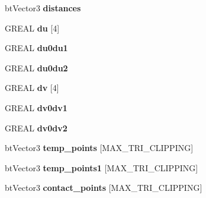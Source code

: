 \begin{DoxyCompactItemize}
bt\+Vector3 {\bfseries distances}
\item 
\mbox{\label{classGIM__TRIANGLE__CALCULATION__CACHE_ae474980d30044017d14e6acd7efdf16b}} 
G\+R\+E\+AL {\bfseries du} \mbox{[}4\mbox{]}
\item 
\mbox{\label{classGIM__TRIANGLE__CALCULATION__CACHE_a1ff1981491d8af6e983b874fc92f4352}} 
G\+R\+E\+AL {\bfseries du0du1}
\item 
\mbox{\label{classGIM__TRIANGLE__CALCULATION__CACHE_a9e8a9a0edf7640943bf33a3b41b1420b}} 
G\+R\+E\+AL {\bfseries du0du2}
\item 
\mbox{\label{classGIM__TRIANGLE__CALCULATION__CACHE_a04a660ca076e471a4c08599baace243a}} 
G\+R\+E\+AL {\bfseries dv} \mbox{[}4\mbox{]}
\item 
\mbox{\label{classGIM__TRIANGLE__CALCULATION__CACHE_a2b501162b45e6c8bc7c5c55d979136e0}} 
G\+R\+E\+AL {\bfseries dv0dv1}
\item 
\mbox{\label{classGIM__TRIANGLE__CALCULATION__CACHE_a27ea3417a38ad40d7f370ef063e6f7f0}} 
G\+R\+E\+AL {\bfseries dv0dv2}
\item 
\mbox{\label{classGIM__TRIANGLE__CALCULATION__CACHE_a076889e78d206b77d790977c9407e390}} 
bt\+Vector3 {\bfseries temp\+\_\+points} \mbox{[}M\+A\+X\+\_\+\+T\+R\+I\+\_\+\+C\+L\+I\+P\+P\+I\+NG\mbox{]}
\item 
\mbox{\label{classGIM__TRIANGLE__CALCULATION__CACHE_ac49bb92226e6125e74cfd5ca6f7e2d02}} 
bt\+Vector3 {\bfseries temp\+\_\+points1} \mbox{[}M\+A\+X\+\_\+\+T\+R\+I\+\_\+\+C\+L\+I\+P\+P\+I\+NG\mbox{]}
\item 
\mbox{\label{classGIM__TRIANGLE__CALCULATION__CACHE_affea62039e67b53ec2bddbc4617ea26e}} 
bt\+Vector3 {\bfseries contact\+\_\+points} \mbox{[}M\+A\+X\+\_\+\+T\+R\+I\+\_\+\+C\+L\+I\+P\+P\+I\+NG\mbox{]}
\end{DoxyCompactItemize}


